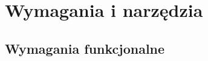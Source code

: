 \documentclass[a4paper,twoside,12pt]{book}
\newtheorem{Definition}{Definicja}
\newtheorem{Example}{Przykład}
\newtheorem{Theorem}{Twierdzenie}
\begin{document}
%
%



 

\chapter{Wymagania i narzędzia}
\label{ch:wymagania-i-narzedzia}


\section{Wymagania funkcjonalne}
\end{document}
